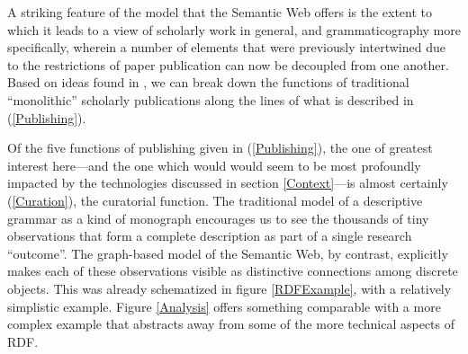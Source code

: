 \documentclass[12pt]{article}
\newcommand{\pref}[1]{(\ref{#1})}
\newcommand{\sref}[1]{section \ref{#1}}
\newcommand{\fref}[1]{figure \ref{#1}}
\newcommand\namecite{\citet}
\begin{document}
A striking feature of the model that the Semantic Web
offers is the extent to which it leads to a view of scholarly work in
general, and grammaticography more specifically, wherein a number of elements
that were previously intertwined due to the restrictions of paper
publication can now be decoupled from one another. Based on ideas found in
\namecite{Neylon:2010}, we can break down the functions of traditional
``monolithic'' scholarly publications along the lines of what is described
in \pref{Publishing}.

	

Of the five functions of publishing given in \pref{Publishing}, the one of
greatest interest here---and the one which would would seem to be most
profoundly impacted by the technologies discussed in \sref{Context}---is almost
certainly \pref{Curation}, the curatorial function. The traditional model of a
descriptive grammar as a kind of monograph encourages us to see the thousands of
tiny observations that form a complete description as part
of a single research ``outcome''. The graph-based model of the Semantic Web, by
contrast, explicitly makes each of these observations visible as distinctive
connections among discrete objects. This was already schematized in
\fref{RDFExample}, with a relatively simplistic example. Figure \ref{Analysis}
offers something comparable with a more complex example that abstracts away from
some of the more technical aspects of RDF.
\end{document}
